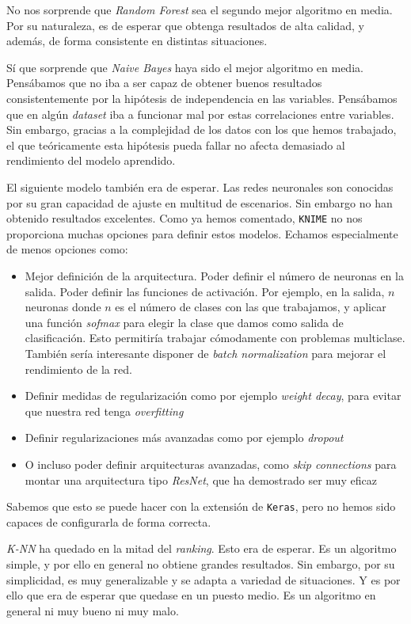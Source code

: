 \documentclass[11pt]{article}
\begin{document}
No nos sorprende que \emph{Random Forest} sea el segundo mejor algoritmo en media. Por su naturaleza, es de esperar que obtenga resultados de alta calidad, y además, de forma consistente en distintas situaciones.

Sí que sorprende que \emph{Naive Bayes} haya sido el mejor algoritmo en media. Pensábamos que no iba a ser capaz de obtener buenos resultados consistentemente por la hipótesis de independencia en las variables. Pensábamos que en algún \emph{dataset} iba a funcionar mal por estas correlaciones entre variables. Sin embargo, gracias a la complejidad de los datos con los que hemos trabajado, el que teóricamente esta hipótesis pueda fallar no afecta demasiado al rendimiento del modelo aprendido.

El siguiente modelo también era de esperar. Las redes neuronales son conocidas por su gran capacidad de ajuste en multitud de escenarios. Sin embargo no han obtenido resultados excelentes. Como ya hemos comentado, \lstinline{KNIME} no nos proporciona muchas opciones para definir estos modelos. Echamos especialmente de menos opciones como:

\begin{itemize}
    \item Mejor definición de la arquitectura. Poder definir el número de neuronas en la salida. Poder definir las funciones de activación. Por ejemplo, en la salida, $n$ neuronas donde $n$ es el número de clases con las que trabajamos, y aplicar una función \emph{sofmax} para elegir la clase que damos como salida de clasificación. Esto permitiría trabajar cómodamente con problemas multiclase. También sería interesante disponer de \emph{batch normalization} para mejorar el rendimiento de la red.
    \item Definir medidas de regularización como por ejemplo \emph{weight decay}, para evitar que nuestra red tenga \emph{overfitting}
    \item Definir regularizaciones más avanzadas como por ejemplo \emph{dropout}
    \item O incluso poder definir arquitecturas avanzadas, como \emph{skip connections} para montar una arquitectura tipo \emph{ResNet}, que ha demostrado ser muy eficaz
\end{itemize}

Sabemos que esto se puede hacer con la extensión de \lstinline{Keras}, pero no hemos sido capaces de configurarla de forma correcta.

\emph{K-NN} ha quedado en la mitad del \emph{ranking}. Esto era de esperar. Es un algoritmo simple, y por ello en general no obtiene grandes resultados. Sin embargo, por su simplicidad, es muy generalizable y se adapta a variedad de situaciones. Y es por ello que era de esperar que quedase en un puesto medio. Es un algoritmo en general ni muy bueno ni muy malo.
\end{document}
